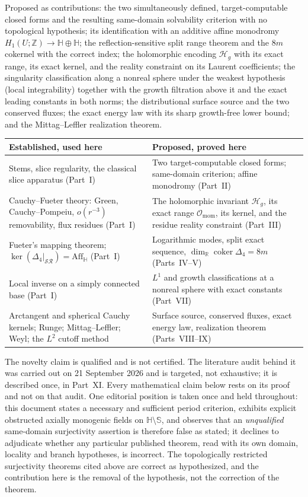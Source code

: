 \documentclass[11pt,a4paper]{article}
\numberwithin{equation}{section}
\theoremstyle{definition}
\theoremstyle{remark}
\theoremstyle{plain}
\newcommand{\HH}{\mathbb H}
\newcommand{\RR}{\mathbb R}
\newcommand{\ZZ}{\mathbb Z}
\newcommand{\SSS}{\mathbb S}
\newcommand{\lap}{\Delta_4}
\newcommand{\SR}{\mathcal{SR}}
\newcommand{\Aff}{\mathrm{Aff}_{\HH}}
\newcommand{\Omom}{\mathcal O_{\mathrm{mom}}}
\newcommand{\Hg}{\mathcal H_{g}}      %
\begin{document}
Proposed as contributions: the two simultaneously defined, target-computable
closed forms and the resulting same-domain solvability criterion with no
topological hypothesis; its identification with an additive affine monodromy
$H_1(U;\ZZ)\to\HH\oplus\HH$; the reflection-sensitive split range theorem and
the $8m$ cokernel with the correct index; the holomorphic encoding $\Hg$ with
its exact range, its exact kernel, and the reality constraint on its Laurent
coefficients; the singularity classification along a nonreal sphere under the
weakest hypothesis (local integrability) together with the growth filtration
above it and the exact leading constants in both norms; the distributional
surface source and the two conserved fluxes; the exact energy law with its
sharp growth-free lower bound; and the Mittag--Leffler realization theorem.

\begin{center}
\small
\renewcommand{\arraystretch}{1.18}
\begin{tabular}{@{}p{}p{}@{}}
\toprule
Established, used here & Proposed, proved here\\
\midrule
Stems, slice regularity, the classical slice apparatus (Part~I)
 & Two target-computable closed forms; same-domain criterion; affine
   monodromy (Part~II)\\
Cauchy--Fueter theory: Green, Cauchy--Pompeiu, $o(r^{-3})$ removability,
 flux residues (Part~I)
 & The holomorphic invariant $\Hg$, its exact range $\Omom$, its kernel,
   and the residue reality constraint (Part~III)\\
Fueter's mapping theorem; $\ker(\lap|_{\SR})=\Aff$ (Part~I)
 & Logarithmic modes, split exact sequence, $\dim_\RR\operatorname{coker}
   \lap=8m$ (Parts~IV--V)\\
Local inverse on a simply connected base (Part~I)
 & $L^1$ and growth classifications at a nonreal sphere with exact
   constants (Part~VII)\\
Arctangent and spherical Cauchy kernels; Runge; Mittag--Leffler; Weyl;
 the $L^2$ cutoff method
 & Surface source, conserved fluxes, exact energy law, realization
   theorem (Parts~VIII--IX)\\
\bottomrule
\end{tabular}
\end{center}

\medskip
The novelty claim is qualified and is not certified. The literature audit
behind it was carried out on 21 September 2026 and is targeted, not
exhaustive; it is described once, in Part~XI. Every mathematical claim below
rests on its proof and not on that audit. One editorial position is taken
once and held throughout: this document states a necessary and sufficient
period criterion, exhibits explicit obstructed axially monogenic fields on
$\HH\setminus\SSS$, and observes that an \emph{unqualified} same-domain
surjectivity assertion is therefore false as stated; it declines to adjudicate
whether any particular published theorem, read with its own domain, locality
and branch hypotheses, is incorrect. The topologically restricted
surjectivity theorems cited above are correct as hypothesized, and the
contribution here is the removal of the hypothesis, not the correction of the
theorem.
\end{document}
